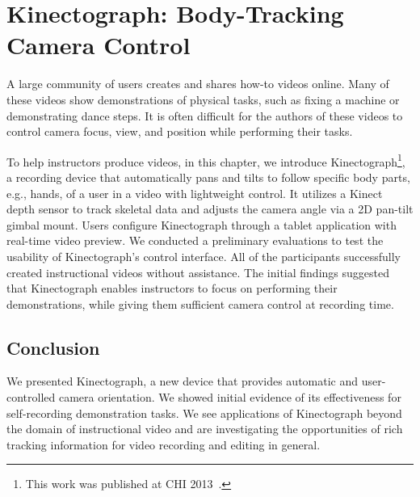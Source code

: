 \chapter{Kinectograph: Body-Tracking Camera Control}
\label{chapter_kinectograph}

A large community of users creates and shares how-to videos online. Many of these videos show demonstrations of physical tasks, such as fixing a machine or demonstrating dance steps. It is often difficult for the authors of these videos to control camera focus, view, and position while performing their tasks.

To help instructors produce videos, in this chapter, we introduce Kinectograph\footnote{This work was published at CHI 2013~\cite{Cheng:2013:BCC:2468356.2468568}.}, a recording device that automatically pans and tilts to follow specific body parts, e.g., hands, of a user in a video with lightweight control. It utilizes a Kinect depth sensor to track skeletal data and adjusts the camera angle via a 2D pan-tilt gimbal mount. Users configure Kinectograph through a tablet application with real-time video preview. We conducted a preliminary evaluations to test the usability of Kinectograph's control interface. All of the participants successfully created instructional videos without assistance. The initial findings suggested that Kinectograph enables instructors to focus on performing their demonstrations, while giving them sufficient camera control at recording time.











\section{Conclusion}
We presented Kinectograph, a new device that provides automatic and user-controlled camera orientation. We showed initial evidence of its effectiveness for self-recording demonstration tasks. We see applications of Kinectograph beyond the domain of instructional video and are investigating the opportunities of rich tracking information for video recording and editing in general.

